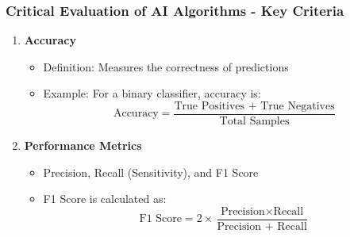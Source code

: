 \documentclass[aspectratio=169]{beamer}
\begin{document}
\begin{frame}[fragile]
    \frametitle{Critical Evaluation of AI Algorithms - Key Criteria}
    \begin{enumerate}
        \item \textbf{Accuracy}
            \begin{itemize}
                \item Definition: Measures the correctness of predictions
                \item Example: For a binary classifier, accuracy is:
                \begin{equation}
                    \text{Accuracy} = \frac{\text{True Positives + True Negatives}}{\text{Total Samples}}
                \end{equation}
            \end{itemize}
        \item \textbf{Performance Metrics}
            \begin{itemize}
                \item Precision, Recall (Sensitivity), and F1 Score
                \item F1 Score is calculated as:
                \begin{equation}
                    \text{F1 Score} = 2 \times \frac{\text{Precision} \times \text{Recall}}{\text{Precision + Recall}}
                \end{equation}
            \end{itemize}
    \end{enumerate}
\end{frame}
\end{document}
